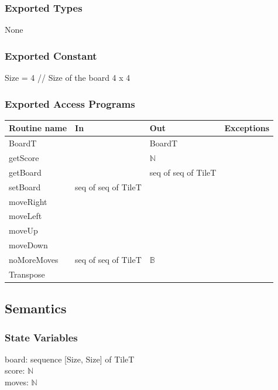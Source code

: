 \documentclass[12pt]{article}
\begin{document}
\subsubsection* {Exported Types}

None

\subsubsection* {Exported Constant}

Size = 4 \quad // Size of the board 4 x 4

\subsubsection* {Exported Access Programs}

\begin{tabular}{| l | l | l | l |}
\hline
\textbf{Routine name} & \textbf{In} & \textbf{Out} & \textbf{Exceptions}\\
\hline
BoardT & ~ & BoardT & \\
\hline
getScore & ~ & $\mathbb{N}$ & \\
\hline
getBoard & ~ & seq of seq of TileT & \\
\hline
setBoard & seq of seq of TileT & ~ & \\
\hline
moveRight & ~ & ~ & \\
\hline
moveLeft & ~ & ~ & \\
\hline
moveUp & ~ & ~ & \\
\hline
moveDown & ~ & ~ & \\
\hline
noMoreMoves & seq of seq of TileT & $\mathbb{B}$ & \\
\hline
Transpose & ~ & ~ & \\

\hline
\end{tabular}

\subsection* {Semantics}

\subsubsection* {State Variables}

board: sequence [Size, Size] of TileT \\
score: $\mathbb{N}$ \\
moves: $\mathbb{N}$
\end{document}
